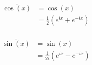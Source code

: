 \begin{equation}\label{eq:Sinusoid_Complex_Conjugate-Cosine}
  \begin{aligned}
    \overline{\cos(x)} &= \cos(x) \\
    &= \frac{1}{2} \left( e^{ix} + e^{-ix} \right) \\
  \end{aligned}
\end{equation}

\begin{equation}\label{eq:Sinusoid_Complex_Conjugate-Sine}
  \begin{aligned}
    \overline{\sin(x)} &= \sin(x) \\
    &= \frac{1}{2i} \left( e^{ix} - e^{-ix} \right) \\
  \end{aligned}
\end{equation}




